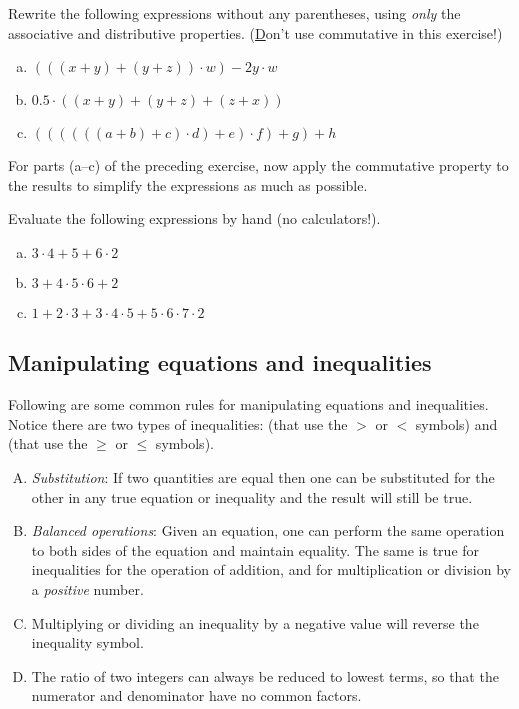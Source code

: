 \begin{exercise}
Rewrite the following expressions without any parentheses, using \emph{only} the  associative and distributive properties.  ({\underline Don't use commutative in this exercise!})
\begin{enumerate}[(a)]
\item
$(((x + y) + (y+z))\cdot w) - 2y \cdot w$
\item
$0.5 \cdot ( (x+y) + (y + z) + (z + x))$
\item
$((((((a+b)+c) \cdot d)+ e) \cdot f) + g) + h$
\end{enumerate}
\end{exercise}

\begin{exercise}
For parts (a--c) of the preceding exercise, now apply the commutative property to the results to simplify the expressions as much as possible.
\end{exercise}

\begin{exercise}
Evaluate the following expressions by hand (no calculators!).
\begin{enumerate}[(a)]
\item
$3 \cdot 4 + 5 + 6 \cdot 2$
\item
$3 + 4 \cdot 5 \cdot 6 + 2$
\item
$1 + 2 \cdot 3 + 3 \cdot 4 \cdot 5 + 5 \cdot 6 \cdot 7 \cdot 2$
\end{enumerate}
\end{exercise}

\subsection {Manipulating equations and inequalities}

Following are some common rules for manipulating equations and inequalities. Notice there are two types of inequalities:   (that use the $>$ or $<$ symbols) and  (that use the $\ge$ or $\le$ symbols). 

\begin {enumerate}[(A)]
\item
\emph{Substitution}: If two quantities are equal then one can be substituted for the other in any true equation or inequality and the result will still be true. 
\item
\emph{Balanced operations}: Given an equation, one can perform the same operation to both sides of the equation and maintain equality.  The same is true for inequalities for the operation of addition, and for multiplication or division by a \emph{positive} number.
\item
Multiplying or dividing an inequality by a negative value will reverse the inequality symbol.
\item
The ratio of two integers can always be reduced to lowest terms, so that the numerator and denominator have no common factors.
\end {enumerate}

